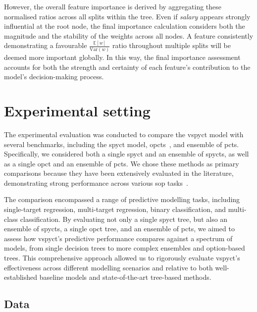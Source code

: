 \documentclass[3p,review,authoryear]{elsarticle}
\begin{document}
However, the overall feature importance is derived by aggregating these normalised ratios across all splits within the tree.
Even if \textit{salary} appears strongly influential at the root node, the final importance calculation considers both the magnitude and the stability of the weights across all nodes.
A feature consistently demonstrating a favourable \(\frac{\mathbb{E}[w]}{\text{Var}(w)}\) ratio throughout multiple splits will be deemed more important globally.
In this way, the final importance assessment accounts for both the strength and certainty of each feature’s contribution to the model’s decision-making process.


\section{Experimental setting}
The experimental evaluation was conducted to compare the \gls{vspyct} model with several benchmarks, including the \gls{spyct} model, \glspl{opct}~\citep{Stepisnik_2020}, and ensemble of \glspl{pct}.
Specifically, we considered both a single \gls{spyct} and an ensemble of \glspl{spyct}, as well as a single \gls{opct} and an ensemble of \glspl{pct}.
We chose these methods as primary comparisons because they have been extensively evaluated in the literature, demonstrating strong performance across various \gls{sop} tasks~\citep{Andonovikj_2024, Stepi_nik_2021}.

The comparison encompassed a range of predictive modelling tasks, including single-target regression, multi-target regression, binary classification, and multi-class classification.
By evaluating not only a single \gls{spyct} tree, but also an ensemble of \glspl{spyct}, a single \gls{opct} tree, and an ensemble of \glspl{pct}, we aimed to assess how \gls{vspyct}'s predictive performance compares against a spectrum of models, from single decision trees to more complex ensembles and option-based trees.
This comprehensive approach allowed us to rigorously evaluate \gls{vspyct}'s effectiveness across different modelling scenarios and relative to both well-established baseline models and state-of-the-art tree-based methods.


\subsection{Data}
\end{document}
